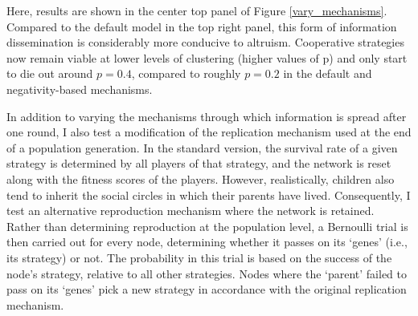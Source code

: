 \documentclass{JASSS}
\begin{document}
Here, results are shown in the center top panel of Figure \ref{vary_mechanisms}. Compared to the default model in the top right panel, this form of information dissemination is considerably more conducive to altruism. Cooperative strategies now remain viable at lower levels of clustering (higher values of p) and only start to die out around $p=0.4$, compared to roughly $p=0.2$ in the default and negativity-based mechanisms.

In addition to varying the mechanisms through which information is spread after one round, I also test a modification of the replication mechanism used at the end of a population generation. In the standard version, the survival rate of a given strategy is determined by all players of that strategy, and the network is reset along with the fitness scores of the players. However, realistically, children also tend to inherit the social circles in which their parents have lived. Consequently, I test an alternative reproduction mechanism where the network is retained. Rather than determining reproduction at the population level, a Bernoulli trial is then carried out for every node, determining whether it passes on its `genes' (i.e., its strategy) or not. The probability in this trial is based on the success of the node's strategy, relative to all other strategies. Nodes where the `parent' failed to pass on its `genes' pick a new strategy in accordance with the original replication mechanism.
\end{document}
